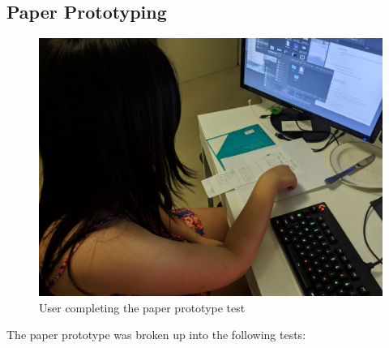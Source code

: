 \subsection{Paper Prototyping}
\begin{figure}
	\centering
	\includegraphics[width=0.8\linewidth]{rainy}
	\caption{User completing the paper prototype test}
\end{figure}

The paper prototype was broken up into the following tests:

